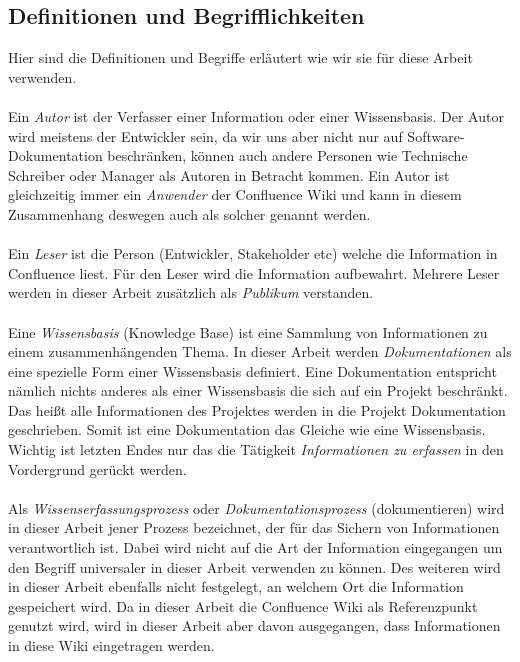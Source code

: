 \documentclass[a4paper,12pt,twoside]{scrartcl}
\begin{document}
\subsection{Definitionen und Begrifflichkeiten}
\label{Definitionen und Begrifflichkeiten}
Hier sind die Definitionen und Begriffe erläutert wie wir sie für diese Arbeit verwenden.
\\\\
Ein \textit{Autor} ist der Verfasser einer Information oder einer Wissensbasis. Der Autor wird meistens der Entwickler sein, da wir uns aber nicht nur auf Software-Dokumentation beschränken, können auch andere Personen wie Technische Schreiber oder Manager als Autoren in Betracht kommen. Ein Autor ist gleichzeitig immer ein \textit{Anwender} der Confluence Wiki und kann in diesem Zusammenhang deswegen auch als solcher genannt werden.
\\\\
Ein \textit{Leser} ist die Person (Entwickler, Stakeholder etc) welche die Information in Confluence liest. Für den Leser wird die Information aufbewahrt. Mehrere Leser werden in dieser Arbeit zusätzlich als \textit{Publikum} verstanden.
\\\\
Eine \textit{Wissensbasis} (Knowledge Base) ist eine Sammlung von Informationen zu einem zusammenhängenden Thema. In dieser Arbeit werden \textit{Dokumentationen} als eine spezielle Form einer Wissensbasis definiert. Eine Dokumentation entspricht nämlich nichts anderes als einer Wissensbasis die sich auf ein Projekt beschränkt. Das heißt alle Informationen des Projektes werden in die Projekt Dokumentation geschrieben. Somit ist eine Dokumentation das Gleiche wie eine Wissensbasis. Wichtig ist letzten Endes nur das die Tätigkeit \textit{Informationen zu erfassen} in den Vordergrund gerückt werden.   
\\\\
Als \textit{Wissenserfassungsprozess} oder \textit{Dokumentationsprozess} (dokumentieren) wird in dieser Arbeit jener Prozess bezeichnet, der für das Sichern von Informationen verantwortlich ist. Dabei wird nicht auf die Art der Information eingegangen um den Begriff universaler in dieser Arbeit verwenden zu können. Des weiteren wird in dieser Arbeit ebenfalls nicht festgelegt, an welchem Ort die Information gespeichert wird. Da in dieser Arbeit die Confluence Wiki als Referenzpunkt genutzt wird, wird in dieser Arbeit aber davon ausgegangen, dass Informationen in diese Wiki eingetragen werden.
\\\\
\end{document}
